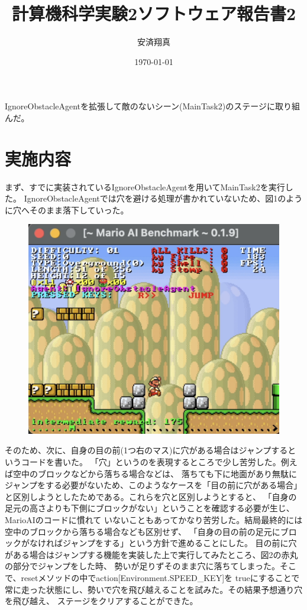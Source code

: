 \documentclass[a4paper,11pt]{jsarticle}
\begin{document}
\title{計算機科学実験2ソフトウェア報告書2}
\author{安済翔真}
\date{\today}
\maketitle

IgnoreObstacleAgentを拡張して敵のないシーン(MainTask2)のステージに取り組んだ。

\section*{実施内容}

まず、すでに実装されているIgnoreObstacleAgentを用いてMainTask2を実行した。
IgnoreObstacleAgentでは穴を避ける処理が書かれていないため、図1のように穴へそのまま落下していった。

\begin{figure}[h]
  \centering
  \includegraphics*[scale=0.3]{
    images/report2/ignore-obstacle-fail.png
  }
  \caption[図1]{}
\end{figure}

そのため、次に、自身の目の前(1つ右のマス)に穴がある場合はジャンプするというコードを書いた。
「穴」というのを表現するところで少し苦労した。例えば空中のブロックなどから落ちる場合などは、
落ちても下に地面があり無駄にジャンプをする必要がないため、このようなケースを「目の前に穴がある場合」
と区別しようとしたためである。これらを穴と区別しようとすると、
「自身の足元の高さよりも下側にブロックがない」ということを確認する必要が生じ、MarioAIのコードに慣れて
いないこともあってかなり苦労した。結局最終的には空中のブロックから落ちる場合なども区別せず、
「自身の目の前の足元にブロックがなければジャンプをする」という方針で進めることにした。
目の前に穴がある場合はジャンプする機能を実装した上で実行してみたところ、図2の赤丸の部分でジャンプをした時、
勢いが足りずそのまま穴に落ちてしまった。そこで、resetメソッドの中でaction[Environment.SPEED\_KEY]を
trueにすることで常に走った状態にし、勢いで穴を飛び越えることを試みた。その結果予想通り穴を飛び越え、
ステージをクリアすることができた。
\end{document}

